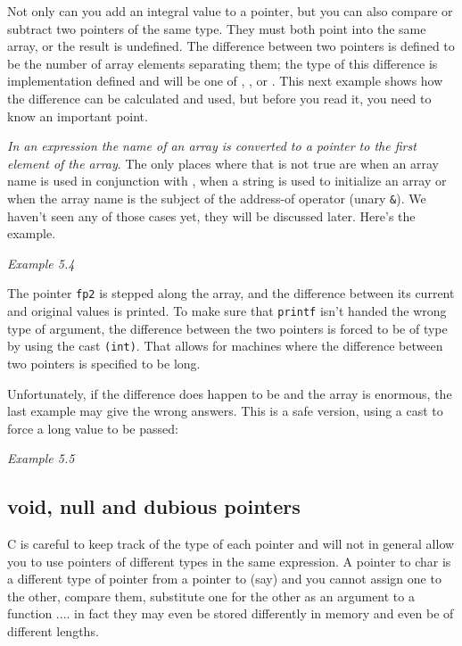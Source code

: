    Not only can you add an integral value to a pointer, but you can also
    compare or subtract two pointers of the same type. They must both point
    into the same array, or the result is undefined. The difference between
    two pointers is defined to be the number of array elements separating
    them; the type of this difference is implementation defined and will be
    one of \short, \kint, or \klong. This
    next example shows how the difference can be calculated and used, but
    before you read it, you need to know an important point.


   \textit{In an expression the name of an array is converted to a pointer to
    the first element of the array}. The only places where that is not
    true are when an array name is used in conjunction with
    \sizeof, when a string is used to initialize an array or
    when the array name is the subject of the address-of operator (unary
    \texttt{\&}). We haven't seen any of those cases yet, they will
    be discussed later. Here's the example.


    \begin{center}\textit{Example 5.4}\end{center}


   The pointer \texttt{fp2} is stepped along the array, and the
    difference between its current and original values is printed. To make
    sure that \texttt{printf} isn't handed the wrong type of argument,
    the difference between the two pointers is forced to be of type
    \kint{} by using the cast \texttt{(int)}. That allows for
    machines where the difference between two pointers is specified to be
    long.


   Unfortunately, if the difference does happen to be \klong{}
    and the array is enormous, the last example may give the wrong answers.
    This is a safe version, using a cast to force a long value to be
    passed:


    \begin{center}\textit{Example 5.5}\end{center}


  

  \subsection{void, null and dubious pointers}
   

   C is careful to keep track of the type of each pointer and will not in
    general allow you to use pointers of different types in the same
    expression. A pointer to char is a different type of pointer from
    a pointer to \kint{} (say) and you cannot assign one to the
    other, compare them, substitute one for the other as an argument to
    a function .... in fact they may even be stored differently in memory
    and even be of different lengths.



